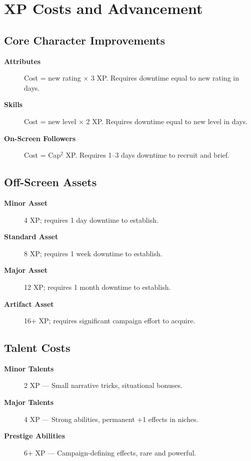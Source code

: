 \section{XP Costs and Advancement}
\label{sec:xp-costs}

\subsection{Core Character Improvements}
\label{subsec:core-improvements}

\begin{description}
\item[\textbf{Attributes}] Cost = new rating $\times$ 3 XP. Requires downtime equal to new rating in days.
\item[\textbf{Skills}] Cost = new level $\times$ 2 XP. Requires downtime equal to new level in days.
\item[\textbf{On-Screen Followers}] Cost = Cap$^{2}$ XP. Requires 1--3 days downtime to recruit and brief.
\end{description}

\subsection{Off-Screen Assets}
\label{subsec:off-screen-assets}

\begin{description}
\item[\textbf{Minor Asset}] 4 XP; requires 1 day downtime to establish.
\item[\textbf{Standard Asset}] 8 XP; requires 1 week downtime to establish.
\item[\textbf{Major Asset}] 12 XP; requires 1 month downtime to establish.
\item[\textbf{Artifact Asset}] 16+ XP; requires significant campaign effort to acquire.
\end{description}

\subsection{Talent Costs}
\label{subsec:talent-costs}

\begin{description}
\item[\textbf{Minor Talents}] 2 XP --- Small narrative tricks, situational bonuses.
\item[\textbf{Major Talents}] 4 XP --- Strong abilities, permanent +1 effects in niches.
\item[\textbf{Prestige Abilities}] 6+ XP --- Campaign-defining effects, rare and powerful.
\end{description}


